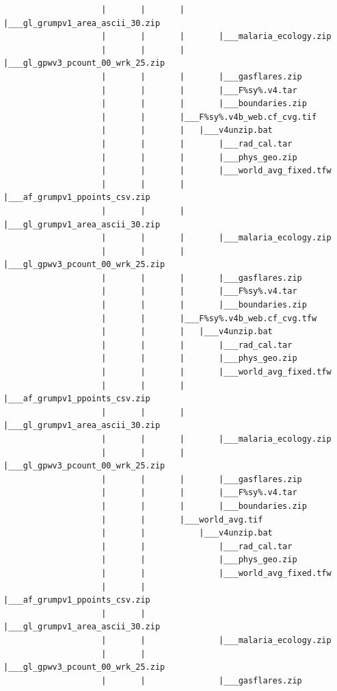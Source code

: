 \documentclass[]{book}
\begin{document}
\begin{verbatim}
                    |       |       |       |___gl_grumpv1_area_ascii_30.zip
                    |       |       |       |___malaria_ecology.zip
                    |       |       |       |___gl_gpwv3_pcount_00_wrk_25.zip
                    |       |       |       |___gasflares.zip
                    |       |       |       |___F%sy%.v4.tar
                    |       |       |       |___boundaries.zip
                    |       |       |___F%sy%.v4b_web.cf_cvg.tif
                    |       |       |   |___v4unzip.bat
                    |       |       |       |___rad_cal.tar
                    |       |       |       |___phys_geo.zip
                    |       |       |       |___world_avg_fixed.tfw
                    |       |       |       |___af_grumpv1_ppoints_csv.zip
                    |       |       |       |___gl_grumpv1_area_ascii_30.zip
                    |       |       |       |___malaria_ecology.zip
                    |       |       |       |___gl_gpwv3_pcount_00_wrk_25.zip
                    |       |       |       |___gasflares.zip
                    |       |       |       |___F%sy%.v4.tar
                    |       |       |       |___boundaries.zip
                    |       |       |___F%sy%.v4b_web.cf_cvg.tfw
                    |       |       |   |___v4unzip.bat
                    |       |       |       |___rad_cal.tar
                    |       |       |       |___phys_geo.zip
                    |       |       |       |___world_avg_fixed.tfw
                    |       |       |       |___af_grumpv1_ppoints_csv.zip
                    |       |       |       |___gl_grumpv1_area_ascii_30.zip
                    |       |       |       |___malaria_ecology.zip
                    |       |       |       |___gl_gpwv3_pcount_00_wrk_25.zip
                    |       |       |       |___gasflares.zip
                    |       |       |       |___F%sy%.v4.tar
                    |       |       |       |___boundaries.zip
                    |       |       |___world_avg.tif
                    |       |           |___v4unzip.bat
                    |       |               |___rad_cal.tar
                    |       |               |___phys_geo.zip
                    |       |               |___world_avg_fixed.tfw
                    |       |               |___af_grumpv1_ppoints_csv.zip
                    |       |               |___gl_grumpv1_area_ascii_30.zip
                    |       |               |___malaria_ecology.zip
                    |       |               |___gl_gpwv3_pcount_00_wrk_25.zip
                    |       |               |___gasflares.zip

\end{verbatim}
\end{document}
